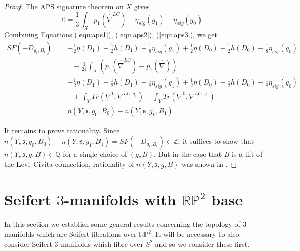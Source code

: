 \documentclass{amsart}
\theoremstyle{definition}
\theoremstyle{remark}
\numberwithin{equation}{section}
\begin{document}
\begin{proof}
The APS signature theorem on $X$ gives
\begin{equation}\label{equ:aps3}
0 = \frac{1}{3} \int_{X} p_1(\widehat{\nabla}^{LC} ) - \eta_{sig}(g_1) + \eta_{sig}(g_0).
\end{equation}
Combining Equations (\ref{equ:aps1}), (\ref{equ:aps2}), (\ref{equ:aps3}), we get
\begin{align*}
SF(-D_{g_t,B_t}) &= -\frac{1}{2}\eta(D_1) + \frac{1}{2}h(D_1) + \frac{1}{8}\eta_{sig}(g_1) + \frac{1}{2}\eta(D_0) - \frac{1}{2}h(D_0) - \frac{1}{8}\eta_{sig}(g_0) \\
& \quad \quad - \frac{1}{24} \int_{X} \left( p_1(\widehat{\nabla}^{LC}) - p_1(\widehat{\nabla}) \right) \\
&= -\frac{1}{2}\eta(D_1) + \frac{1}{2}h(D_1) + \frac{1}{8}\eta_{sig}(g_1) + \frac{1}{2}\eta(D_0) - \frac{1}{2}h(D_0) - \frac{1}{8}\eta_{sig}(g_0) \\
& \quad \quad + \int_Y Tr( \nabla^1 , \nabla^{LC , g_1}) - \int_Y Tr(\nabla^0 , \nabla^{LC , g_0}) \\
& = n(Y, \mathfrak{s} , g_0 , B_0) - n(Y , \mathfrak{s} , g_1 , B_1).
\end{align*}

It remains to prove rationality. Since $n(Y, \mathfrak{s} , g_0 , B_0) - n(Y , \mathfrak{s} , g_1 , B_1) = SF(-D_{g_t,B_t}) \in \mathbb{Z}$, it suffices to show that $n(Y,\mathfrak{s} , g,B) \in \mathbb{Q}$ for a single choice of $(g,B)$. But in the case that $B$ is a lift of the Levi--Civita connection, rationality of $n(Y,\mathfrak{s},g,B)$ was shown in \cite[]{man}.
\end{proof}


\section{Seifert $3$-manifolds with $\mathbb{RP}^2$ base}\label{sec:seifert}

In this section we establish some general results concerning the topology of $3$-manifolds which are Seifert fibrations over $\mathbb{RP}^2$. It will be necessary to also consider Seifert $3$-manifolds which fibre over $S^2$ and so we consider these first.
\end{document}
